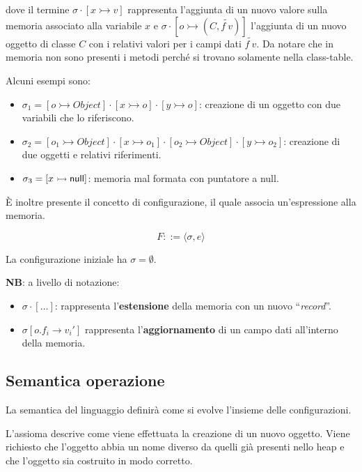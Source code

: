 \noindent dove il termine $ \sigma \cdot [x \rightarrowtail v]$ rappresenta l'aggiunta di un nuovo valore sulla memoria associato alla variabile $x$ e $\sigma \cdot [o \rightarrowtail (C, \tilde{f \ v})]$ l'aggiunta di un nuovo oggetto di classe $C$ con i relativi valori per i campi dati $\tilde{f \ v}$. Da notare che in memoria non sono presenti i metodi perché si trovano solamente nella class-table.

Alcuni esempi sono:

\begin{itemize}
	\item $\sigma_1 = [o \rightarrowtail Object]\cdot[x \rightarrowtail o] \cdot [y \rightarrowtail o] $: creazione di un oggetto con due variabili che lo riferiscono.
	\item $ \sigma_2 = [o_1 \rightarrowtail Object] \cdot [x \rightarrowtail o_1] \cdot  [o_2 \rightarrowtail Object]\cdot [y \rightarrowtail o_2]$: creazione di due oggetti e relativi riferimenti.
	\item $\sigma_3 = [x \rightarrowtail \Null]$: memoria mal formata con puntatore a null.
\end{itemize}

\noindent \`E inoltre presente il concetto di configurazione, il quale associa un'espressione alla memoria.

$$
F ::= \langle \sigma, e\rangle 
$$

\noindent La configurazione iniziale ha $\sigma = \emptyset$.

\textbf{NB}: a livello di notazione:
\begin{itemize}
	\item $	\sigma \cdot [\ldots]$: rappresenta l'\textbf{estensione} della memoria con un nuovo ``\textit{record}''.
	\item $ \sigma[o.f_i \to v_i']$ rappresenta l'\textbf{aggiornamento} di un campo dati all'interno della memoria.
	
\end{itemize}

\subsection{Semantica operazione}

La semantica del linguaggio definirà come si evolve l'insieme delle configurazioni.

L'assioma  descrive come viene effettuata la creazione di un nuovo oggetto. Viene richiesto che l'oggetto abbia un nome diverso da quelli già presenti nello heap e che l'oggetto sia costruito in modo corretto.

